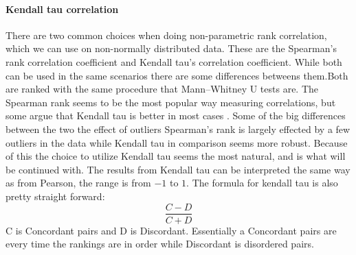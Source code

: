 \paragraph{Kendall tau correlation}
There are two common choices when doing non-parametric rank correlation, which we can use on non-normally distributed data. These are the Spearman's rank correlation coefficient and Kendall tau's correlation coefficient. While both can be used in the same scenarios there are some differences betweens them.Both are ranked with the same procedure that Mann–Whitney U tests are. The Spearman rank seems to be the most popular way measuring correlations, but some argue that Kendall tau is better in most cases \cite{gilpin1993table}. Some of the big differences between the two the effect of outliers Spearman's rank is largely effected by a few outliers in the data while Kendall tau in comparison seems more robust. Because of this the choice to utilize Kendall tau seems the most natural, and is what will be continued with. The results from Kendall tau can be interpreted the same way as from Pearson, the range is from $-1$ to $1$. The formula for kendall tau is also pretty straight forward:
$$\frac{C-D}{C+D}$$
C is Concordant pairs and D is Discordant. Essentially a Concordant pairs are every time the rankings are in order while Discordant is disordered pairs\cite{kendall1938new}.
 
